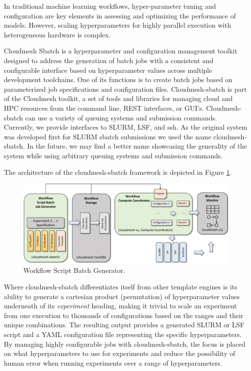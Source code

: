 \documentclass[utf8]{FrontiersinVancouver} %
\begin{document}
{In traditional machine learning workflows, hyper-parameter tuning and
configuration are key elements in assessing and optimizing the
performance of models. However, scaling hyperparameters for highly
parallel execution with heterogeneous hardware is complex.

Cloudmesh Sbatch is a hyperparameter and configuration management
toolkit designed to address the generation of batch jobs with a
consistent and configurable interface based on hyperparameter values
across multiple development toolchains. One of its functions is to
create batch jobs based on parameterized job specifications and
configuration files.  Cloudmesh-sbatch is part of the Cloudmesh
toolkit, a set of tools and libraries for managing cloud and HPC
resources from the command line, REST interfaces, or GUI's.
Cloudmesh-sbatch can use a variety of
queuing systems and submission commands. Currently, we provide
interfaces to SLURM, LSF, and ssh. As the original system was
developed first for SLURM sbatch submissions we used the name
cloudmesh-sbatch. In the future, we may find a better name showcasing the
generality of the system while using arbitrary queuing systems and
submission commands.

The architecture of the cloudmesh-sbatch framework is depicted in
Figure \ref{fig:cm-sbatch}.

\begin{figure}[htb]
    \centering
    \includegraphics[width=1.0\columnwidth]{images/cloudmesh-sbatch-new.pdf}
    \caption{Workflow Script Batch Generator.}
    \label{fig:cm-sbatch}
\end{figure}


Where cloudmesh-sbatch differentiates itself from other template
engines is its ability to generate a cartesian product (permutation)
of hyperparameter values underneath of its {\it experiment} heading,
making it trivial to scale an experiment from one execution to
thousands of configurations based on the ranges and their unique
combinations.  The resulting output provides a generated SLURM or LSF
script and a YAML configuration file representing the specific
hyperparameters.  By managing highly configurable jobs with
cloudmesh-sbatch, the focus is placed on what hyperparameters to use
for experiments and reduce the possibility of human error when running
experiments over a range of hyperparameters.

}
\end{document}
